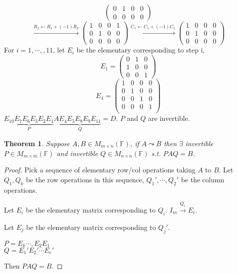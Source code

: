 \documentclass[12pt]{article}
\theoremstyle{plain}
\newtheorem{theorem}{Theorem}[subsection]
\newcommand{\mF}{{\mathbb{F}}}
\begin{document}
{\[\begin{pmatrix}
			0 & 1 & 0 & 0\\
			0 & 0 & 0 & 0
		\end{pmatrix}
	\]
	\[
		\overset{R_1 \leftarrow R_1 + (-1)R_2}{\longrightarrow}
		\begin{pmatrix}
			1 & 0 & 0 & 1\\
			0 & 1 & 0 & 0\\
			0 & 0 & 0 & 0
		\end{pmatrix}
		\overset{C_1 \leftarrow C_1 + (-1)C_1}{\longrightarrow}
		\begin{pmatrix}
			1 & 0 & 0 & 0\\
			0 & 1 & 0 & 0\\
			0 & 0 & 0 & 0
		\end{pmatrix}
	\]
	For $i = 1, \cdots,, 11$, let $E_i$ be the elementary corresponding to step
	i, 
	\[
		E_1 =
		\begin{pmatrix}
			0 & 1 & 0\\
			1 & 0 & 0\\
			0 & 0 & 1
		\end{pmatrix}
	\]
	\[
		E_4 = 
		\begin{pmatrix}
			1 & 0 & 0 & 0	\\
			0 & 1 & 0 & 0	\\
			0 & 0 & 1 & 0	\\
			0 & 0 & 0 & 1	\\
		\end{pmatrix}
	\]
	$\underbrace{E_{10} E_7 E_6 E_3 E_2E_1}_{P} A 
	\underbrace{E_4 E_5E_8 E_9E_{11}}_{Q} = D$.
	$P$ and $Q$ are invertible.\\
	}


	\begin{theorem}
		Suppose $A, B \in M_{m\times n}(\mF)$, if $A \leadsto B$ then $\exists$
		invertible $P \in M_{m\times m} (\mF)$ and invertible 
		$Q \in M_{n \times n} (\mF)$ s.t. $PAQ = B$. 
	\end{theorem}
	\begin{proof}
		Pick a sequence of elementary row/col operations taking $A$ to $B$.
		Let $Q_1, Q_k$ be the row operations in this sequence, $Q_1', \cdots, 
		Q_2'$ be the column operations. 

		Let $E_i$ be the elementary matrix corresponding to $Q_i$.
		$I_m \overset{Q_i}{\longrightarrow} E_i$. 

		Let $E_j$ be the elementary matrix corresponding to $Q_j'$. 

		$P = E_k \cdots, E_2E_1$\\
		$Q = E_1' E_2' \cdots E_e'$

		Then $PAQ = B$. 
	\end{proof}
\end{document}

